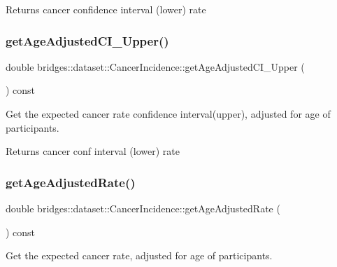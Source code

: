 \begin{DoxyReturn}{Returns}
cancer confidence interval (lower) rate 
\end{DoxyReturn}
\mbox{\label{classbridges_1_1dataset_1_1_cancer_incidence_aa4c0975807e67227388f23fbf92e0867}} 
\subsubsection{\texorpdfstring{getAgeAdjustedCI\_Upper()}{getAgeAdjustedCI\_Upper()}}
{\footnotesize\ttfamily double bridges\+::dataset\+::\+Cancer\+Incidence\+::get\+Age\+Adjusted\+C\+I\+\_\+\+Upper (\begin{DoxyParamCaption}{ }\end{DoxyParamCaption}) const\hspace{0.3cm}{\ttfamily [inline]}}

Get the expected cancer rate confidence interval(upper), adjusted for age of participants.

\begin{DoxyReturn}{Returns}
cancer conf interval (lower) rate 
\end{DoxyReturn}
\mbox{\label{classbridges_1_1dataset_1_1_cancer_incidence_abb8b465d513b8e7113c0dda4f1381b36}} 
\subsubsection{\texorpdfstring{getAgeAdjustedRate()}{getAgeAdjustedRate()}}
{\footnotesize\ttfamily double bridges\+::dataset\+::\+Cancer\+Incidence\+::get\+Age\+Adjusted\+Rate (\begin{DoxyParamCaption}{ }\end{DoxyParamCaption}) const\hspace{0.3cm}{\ttfamily [inline]}}

Get the expected cancer rate, adjusted for age of participants.

